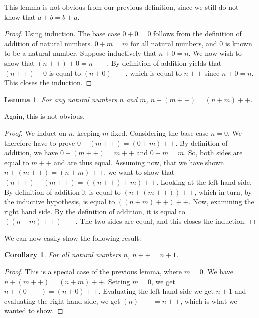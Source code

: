 \documentclass[a4paper, twocolumn]{report}
\newcounter{dummy} \numberwithin{dummy}{section}
\newtheorem{lma}[dummy]{Lemma}
\newtheorem*{crl*}{Corollary}
\theoremstyle{definition}
\theoremstyle{solution}
\newcommand{\dplus}{{+}{+}} %
\begin{document}
This lemma is not obvious from our previous definition, since we still do not
know that $a + b = b + a$. 

\begin{proof}
  Using induction. The base case $0 + 0 = 0$ follows from the definition of
  addition of natural numbers.  $0 + m = m$ for all natural numbers, and $0$ is
  known to be a natural number.  Suppose inductively that $n + 0 = n$. We now
  wish to show that $(n\dplus) + 0 = n\dplus$. By definition of addition yields that
  $(n\dplus) + 0$ is equal to $(n + 0)\dplus$, which is equal to $n\dplus$ since $n + 0 =
  n$. This closes the induction.
\end{proof}

\begin{lma}
  \label{lma_223}
  For any natural numbers $n$ and $m$, $n + (m\dplus) = (n + m)\dplus$.
\end{lma}

Again, this is not obvious. 

\begin{proof}
  We induct on $n$, keeping $m$ fixed. Considering the base case $n = 0$. We
  therefore have to prove $ 0 + (m\dplus) = (0 + m)\dplus$. By definition of
  addition, we have $0 + (m\dplus) = m\dplus$ and $0 + m = m$. So, both sides
  are equal to $m\dplus$ and are thus equal. Assuming now, that we have shown
  $n + (m\dplus) = (n + m)\dplus$, we want to show that $(n\dplus) + (m\dplus)
  = \left( \left( n\dplus \right) + m \right)\dplus$.  Looking at the left hand
  side. By definition of addition it is equal to $\left( n + \left( m\dplus
  \right) \right)\dplus$, which in turn, by the inductive hypothesis, is equal
  to $\left(\left( n + m \right)\dplus\right)\dplus$. Now, examining the right
  hand side. By the definition of addition, it is equal to $\left(\left( n + m
  \right)\dplus\right)\dplus$. The two sides are equal, and this closes the
  induction.
\end{proof}
We can now easily show the following result:
\begin{crl*}
  \label{crl_plusone}
  For all natural numbers $n$, $n\dplus = n + 1$.    
\end{crl*}
\begin{proof}
  This is a special case of the previous lemma, where $m = 0$.  We have $n +
  (m\dplus) = (n + m)\dplus$. Setting $m = 0$, we get $n + (0\dplus) = (n +
  0)\dplus$. Evaluating the left hand side we get $n + 1$ and evaluating the
  right hand side, we get $(n)\dplus = n\dplus$, which is what we wanted to
  show.
\end{proof}
\end{document}
